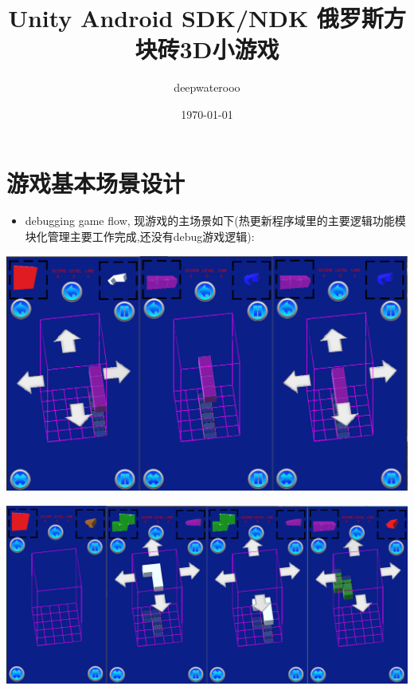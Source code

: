 \documentclass[9pt, b5paper]{article}
\author{deepwaterooo}
\date{\today}
\title{Unity Android SDK/NDK 俄罗斯方块砖3D小游戏}
\begin{document}
\maketitle
\tableofcontents


\section{游戏基本场景设计}
\label{sec-1}
\begin{itemize}
\item debugging game flow, 现游戏的主场景如下(热更新程序域里的主要逻辑功能模块化管理主要工作完成,还没有debug游戏逻辑):
\end{itemize}

\includegraphics[width=.9\linewidth]{./pic/readme_20221030_162737.png}

\includegraphics[width=.9\linewidth]{./pic/readme_20221029_110512.png}
\end{document}
